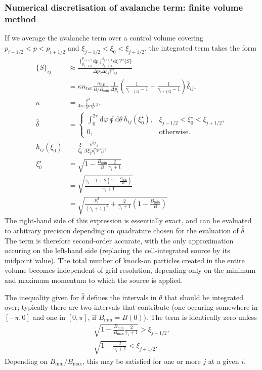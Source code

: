 \documentclass[11pt,a4paper]{article}
\newcommand{\rd}{\ensuremath{\mathrm{d}}}
\newcommand{\sub}[1]{\ensuremath{_{\text{#1}}}}
\begin{document}
\subsubsection{Numerical discretisation of avalanche term: finite volume method}
If we average the avalanche term over a control volume covering $p_{i-1/2} < p < p_{i+1/2}$ and $\xi_{j-1/2} < \xi_0 < \xi_{j+1/2}$, the integrated term takes the form
\begin{align}
 \{S\}_{ij}  & \approx \frac{\int_{p_{i-1/2}}^{p_{i+1/2}}\rd p \int_{\xi_{j-1/2}}^{\xi_{j+1/2}}\rd \xi \, \mathcal{V}'\{S\}}{\Delta p_i \Delta \xi_j \mathcal{V}'_{ij}}  \nonumber \\
 &= \kappa n\sub{tot}\frac{n\sub{RE}}{B/B\sub{min}} \frac{1}{\Delta p_i}\left(\frac{1}{\gamma_{i-1/2}-1} - \frac{1}{\gamma_{i+1/2}-1} \right) \hat{\delta}_{ij},  \\
\kappa &= \frac{e^4}{4\pi\varepsilon_0^2 m_e^2 c^3}, \nonumber \\
\hat\delta &= \begin{cases}
\int_0^{2\pi}\rd\varphi \oint \rd \theta \,  h_{ij}(\xi^\star_0), & \xi_{j-1/2} < \xi_0^\star < \xi_{j+1/2}, %
\\
0, & \text{otherwise.}
\end{cases} \\
h_{ij}(\xi_0) &= \frac{\xi}{\xi_0}\frac{\sqrt{g}_i}{\Delta \xi_j p_i^2 \mathcal{V}'_{ij}}, \nonumber \\
\xi^\star_0 &= \sqrt{ 1 - \frac{B\sub{min}}{B}\frac{2}{\gamma_i+1}} \nonumber \\
&= \sqrt{ \frac{ \gamma_i-1 + 2\left(1-\frac{B\sub{min}}{B}\right) }{\gamma_i+1}} \nonumber \\
&= \sqrt{\frac{p_i^2}{(\gamma_i+1)^2} + \frac{2}{\gamma_i+1}\left(1-\frac{B\sub{min}}{B}\right)}
\end{align}
The right-hand side of this expression is essentially exact, and can be evaluated to arbitrary precision depending on quadrature chosen for the evaluation of $\hat\delta$. The term is therefore second-order accurate, with the only approximation occuring on the left-hand side (replacing the cell-integrated source by its midpoint value). The total number of knock-on particles created in the entire volume becomes independent of grid resolution, depending only on the minimum and maximum momentum to which the source is applied. 

The inequality given for $\hat\delta$ defines the intervals in $\theta$ that should be integrated over; typically there are two intervals that contribute (one occuring somewhere in $[-\pi,0]$ and one in $[0,\pi]$, if $B\sub{min} = B(0)$). The term is identically zero unless
\begin{align}
\sqrt{1-\frac{B\sub{min}}{B\sub{max}}\frac{2}{\gamma_i+1}} > \xi_{j-1/2}, \\
\sqrt{1-\frac{2}{\gamma_i+1}} < \xi_{j+1/2}.
\end{align}
Depending on $B\sub{min}/B\sub{max}$, this may be satisfied for one or more $j$ at a given $i$.
\end{document}
